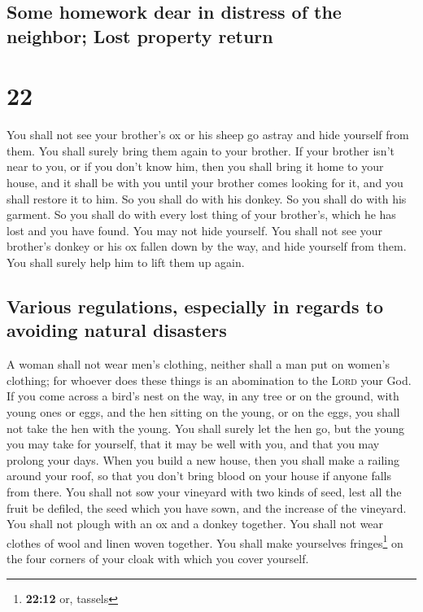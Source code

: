 \hypertarget{some-homework-dear-in-distress-of-the-neighbor-lost-property-return}{%
\subsection{Some homework dear in distress of the neighbor; Lost
property
return}\label{some-homework-dear-in-distress-of-the-neighbor-lost-property-return}}

\hypertarget{section-21}{%
\section{22}\label{section-21}}

 You shall not see your brother's ox or his sheep go
astray and hide yourself from them. You shall surely bring them again to
your brother.  If your brother isn't near to you, or if
you don't know him, then you shall bring it home to your house, and it
shall be with you until your brother comes looking for it, and you shall
restore it to him.  So you shall do with his donkey. So
you shall do with his garment. So you shall do with every lost thing of
your brother's, which he has lost and you have found. You may not hide
yourself.  You shall not see your brother's donkey or his
ox fallen down by the way, and hide yourself from them. You shall surely
help him to lift them up again.

\hypertarget{various-regulations-especially-in-regards-to-avoiding-natural-disasters}{%
\subsection{Various regulations, especially in regards to avoiding
natural
disasters}\label{various-regulations-especially-in-regards-to-avoiding-natural-disasters}}

 A woman shall not wear men's clothing, neither shall a
man put on women's clothing; for whoever does these things is an
abomination to the \textsc{Lord} your God.  If you come
across a bird's nest on the way, in any tree or on the ground, with
young ones or eggs, and the hen sitting on the young, or on the eggs,
you shall not take the hen with the young.  You shall
surely let the hen go, but the young you may take for yourself, that it
may be well with you, and that you may prolong your days. 
When you build a new house, then you shall make a railing around your
roof, so that you don't bring blood on your house if anyone falls from
there.  You shall not sow your vineyard with two kinds of
seed, lest all the fruit be defiled, the seed which you have sown, and
the increase of the vineyard.  You shall not plough with
an ox and a donkey together.  You shall not wear clothes
of wool and linen woven together.  You shall make
yourselves fringes\footnote{\textbf{22:12} or, tassels} on the four
corners of your cloak with which you cover yourself.

